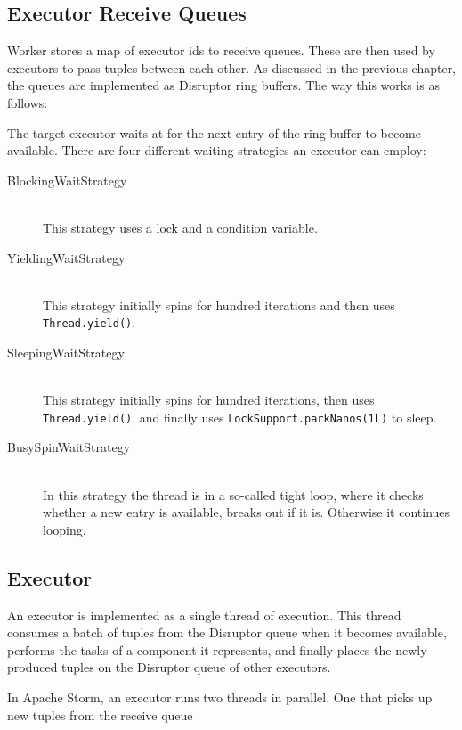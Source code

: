 \subsection{Executor Receive Queues}

Worker stores a map of executor ids to receive queues. These are then used by executors to pass tuples between each other. As discussed in the previous chapter, the queues are implemented as Disruptor ring buffers. The way this works is as follows:

The target executor waits at for the next entry of the ring buffer to become available. There are four different waiting strategies an executor can employ:

\begin{description}
	\item[BlockingWaitStrategy] \hfill \\
	This strategy uses a lock and a condition variable. 
	\item[YieldingWaitStrategy] \hfill \\
	This strategy initially spins for hundred iterations and then uses \texttt{Thread.yield()}.
	\item[SleepingWaitStrategy] \hfill \\
	This strategy initially spins for hundred iterations, then uses \texttt{Thread.yield()}, and finally uses \texttt{LockSupport.parkNanos(1L)} to sleep.
	\item[BusySpinWaitStrategy] \hfill \\
	In this strategy the thread is in a so-called tight loop, where it checks whether a new entry is available, breaks out if it is. Otherwise it continues looping.
\end{description}

\subsection{Executor}

An executor is implemented as a single thread of execution. This thread consumes a batch of tuples from the Disruptor queue when it becomes available, performs the tasks of a component it represents, and finally places the newly produced tuples on the Disruptor queue of other executors.

In Apache Storm, an executor runs two threads in parallel. One that picks up new tuples from the receive queue


